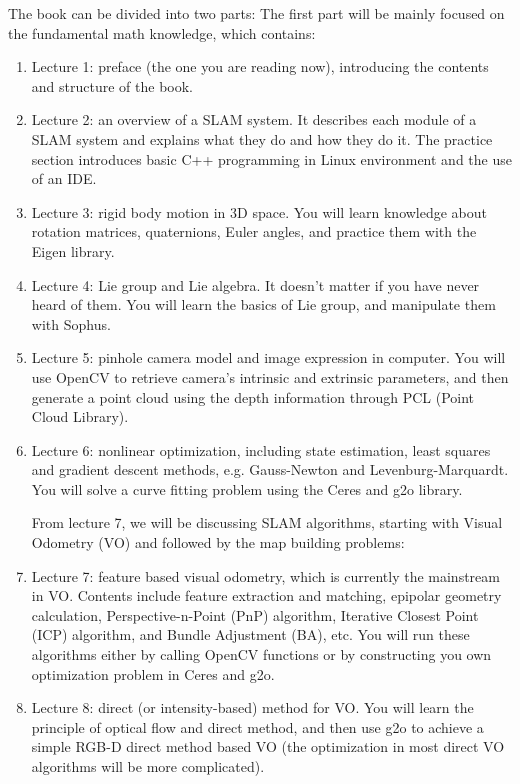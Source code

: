 The book can be divided into two parts: The first part will be mainly focused on the fundamental math knowledge, which contains:
\begin{enumerate}
	\item Lecture 1: preface (the one you are reading now), introducing the contents and structure of the book.
	\item Lecture 2: an overview of a SLAM system. It describes each module of a SLAM system and explains what they do and how they do it. The practice section introduces basic C++ programming in Linux environment and the use of an IDE.
	\item Lecture 3: rigid body motion in 3D space. You will learn knowledge about rotation matrices, quaternions, Euler angles, and practice them with the Eigen library.
	\item Lecture 4: Lie group and Lie algebra. It doesn't matter if you have never heard of them. You will learn the basics of Lie group, and manipulate them with Sophus.
	\item Lecture 5: pinhole camera model and image expression in computer. You will use OpenCV to retrieve camera's intrinsic and extrinsic parameters, and then generate a point cloud using the depth information through PCL (Point Cloud Library). 
	\item Lecture 6: nonlinear optimization, including state estimation, least squares and gradient descent methods, e.g. Gauss-Newton and Levenburg-Marquardt. You will solve a curve fitting problem using the Ceres and g2o library.
	
	From lecture 7, we will be discussing SLAM algorithms, starting with Visual Odometry (VO) and followed by the map building problems: 
	
	\item Lecture 7: feature based visual odometry, which is currently the mainstream in VO. Contents include feature extraction and matching, epipolar geometry calculation, Perspective-n-Point (PnP) algorithm, Iterative Closest Point (ICP) algorithm, and Bundle Adjustment (BA), etc. You will run these algorithms either by calling OpenCV functions or by constructing you own optimization problem in Ceres and g2o.
	
	\item Lecture 8: direct (or intensity-based) method for VO. You will learn the principle of optical flow and direct method, and then use g2o to achieve a simple RGB-D direct method based VO (the optimization in most direct VO algorithms will be more complicated).
	

\end{enumerate}
